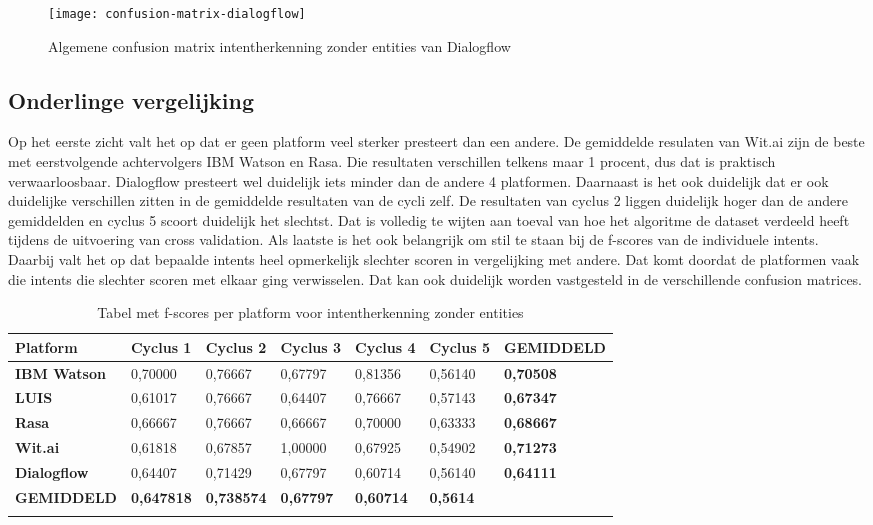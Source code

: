 \begin{figure}[H]
    \label{fig:confusion-matrix-dialogflow}
    \centering
    \texttt{[image: confusion-matrix-dialogflow]}
    \caption{Algemene confusion matrix intentherkenning zonder entities van Dialogflow}
\end{figure}

\subsection{Onderlinge vergelijking}
\label{subsec:intent-onderling}

Op het eerste zicht valt het op dat er geen platform veel sterker presteert dan een andere. De gemiddelde resulaten van Wit.ai zijn de beste met eerstvolgende achtervolgers IBM Watson en Rasa. Die resultaten verschillen telkens maar 1 procent, dus dat is praktisch verwaarloosbaar. Dialogflow presteert wel duidelijk iets minder dan de andere 4 platformen. Daarnaast is het ook duidelijk dat er ook duidelijke verschillen zitten in de gemiddelde resultaten van de cycli zelf. De resultaten van cyclus 2 liggen duidelijk hoger dan de andere gemiddelden en cyclus 5 scoort duidelijk het slechtst. Dat is volledig te wijten aan toeval van hoe het algoritme de dataset verdeeld heeft tijdens de uitvoering van cross validation. Als laatste is het ook belangrijk om stil te staan bij de f-scores van de individuele intents. Daarbij valt het op dat bepaalde intents heel opmerkelijk slechter scoren in vergelijking met andere. Dat komt doordat de platformen vaak die intents die slechter scoren met elkaar ging verwisselen. Dat kan ook duidelijk worden vastgesteld in de verschillende confusion matrices.

\begin{center}
    \begin{longtable}{| l | l | l | l | l |  l | l |}
        \hline
        \textbf{Platform} & \textbf{Cyclus 1} & \textbf{Cyclus 2} & \textbf{Cyclus 3} & \textbf{Cyclus 4} & \textbf{Cyclus 5} & \textbf{GEMIDDELD} \\ \hline
        \textbf{IBM Watson} & 0,70000 & 0,76667 & 0,67797 & 0,81356 & 0,56140 & \textbf{0,70508} \\ \hline  
        \textbf{LUIS} & 0,61017 & 0,76667 & 0,64407 & 0,76667 & 0,57143 & \textbf{0,67347} \\ \hline  
        \textbf{Rasa} & 0,66667 & 0,76667 & 0,66667 & 0,70000 & 0,63333 & \textbf{0,68667} \\ \hline  
        \textbf{Wit.ai} & 0,61818 & 0,67857 & 1,00000 & 0,67925 & 0,54902 & \textbf{0,71273} \\ \hline  
        \textbf{Dialogflow} & 0,64407 & 0,71429 & 0,67797 & 0,60714 & 0,56140 & \textbf{0,64111} \\ \hline  
        \textbf{GEMIDDELD} & \textbf{0,647818} & \textbf{0,738574} & \textbf{0,67797} & \textbf{0,60714} & \textbf{0,5614} &    \\ \hline
        \caption{Tabel met f-scores per platform voor intentherkenning zonder entities}                                    
    \end{longtable}
    \label{tbl:results-intent-no-entity}
\end{center}

